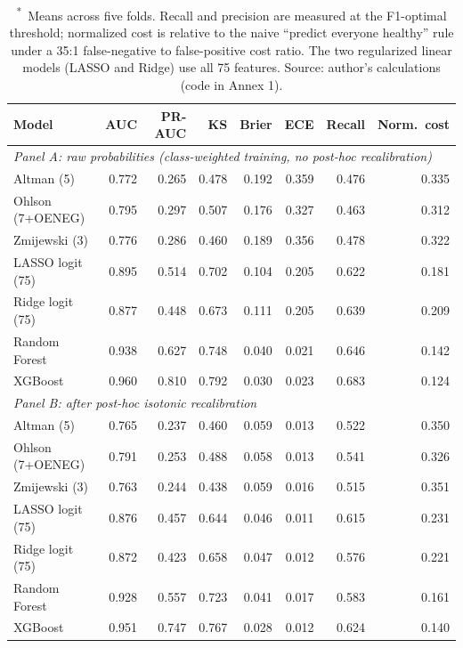 \documentclass[12pt,a4paper]{article}
\begin{document}
\begin{table}[ht]
\centering
\caption{Performance of all seven models at horizon H1, before and after
isotonic recalibration.\textsuperscript{*}}
\label{tab:full-comparison}
\small
\begin{tabular}{lrrrrrrr}
\toprule
Model & AUC & PR-AUC & KS & Brier & ECE & Recall & Norm.\ cost \\
\midrule
\multicolumn{8}{l}{\textit{Panel A: raw probabilities (class-weighted training, no post-hoc recalibration)}} \\
\midrule
Altman (5)         & 0.772 & 0.265 & 0.478 & 0.192 & 0.359 & 0.476 & 0.335 \\
Ohlson (7+OENEG)   & 0.795 & 0.297 & 0.507 & 0.176 & 0.327 & 0.463 & 0.312 \\
Zmijewski (3)      & 0.776 & 0.286 & 0.460 & 0.189 & 0.356 & 0.478 & 0.322 \\
LASSO logit (75)   & 0.895 & 0.514 & 0.702 & 0.104 & 0.205 & 0.622 & 0.181 \\
Ridge logit (75)   & 0.877 & 0.448 & 0.673 & 0.111 & 0.205 & 0.639 & 0.209 \\
Random Forest      & 0.938 & 0.627 & 0.748 & 0.040 & 0.021 & 0.646 & 0.142 \\
XGBoost            & 0.960 & 0.810 & 0.792 & 0.030 & 0.023 & 0.683 & 0.124 \\
\midrule
\multicolumn{8}{l}{\textit{Panel B: after post-hoc isotonic recalibration}} \\
\midrule
Altman (5)         & 0.765 & 0.237 & 0.460 & 0.059 & 0.013 & 0.522 & 0.350 \\
Ohlson (7+OENEG)   & 0.791 & 0.253 & 0.488 & 0.058 & 0.013 & 0.541 & 0.326 \\
Zmijewski (3)      & 0.763 & 0.244 & 0.438 & 0.059 & 0.016 & 0.515 & 0.351 \\
LASSO logit (75)   & 0.876 & 0.457 & 0.644 & 0.046 & 0.011 & 0.615 & 0.231 \\
Ridge logit (75)   & 0.872 & 0.423 & 0.658 & 0.047 & 0.012 & 0.576 & 0.221 \\
Random Forest      & 0.928 & 0.557 & 0.723 & 0.041 & 0.017 & 0.583 & 0.161 \\
XGBoost            & 0.951 & 0.747 & 0.767 & 0.028 & 0.012 & 0.624 & 0.140 \\
\bottomrule
\end{tabular}
\caption*{\footnotesize \textsuperscript{*}~Means across five folds. Recall and precision are
measured at the F1-optimal threshold; normalized cost is relative to the naive
``predict everyone healthy'' rule under a 35:1 false-negative to false-positive
cost ratio. The two regularized linear models (LASSO and Ridge) use all 75
features. Source: author's calculations (code in Annex 1).}
\end{table}
\end{document}
